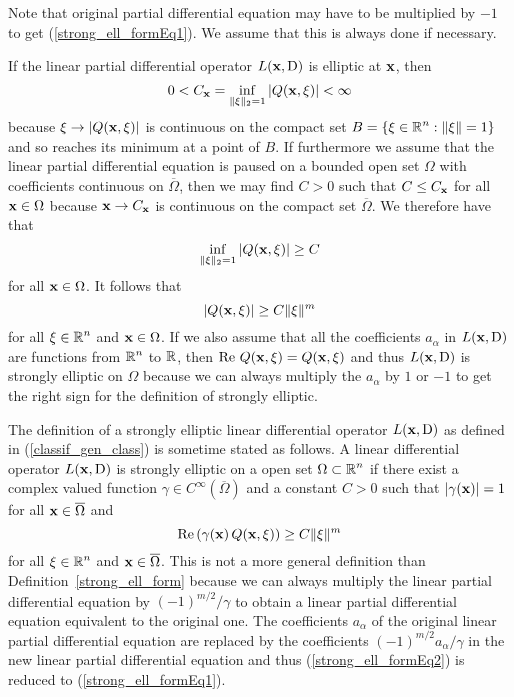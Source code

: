 Note that original partial differential equation may have to be
multiplied by $-1$ to get (\ref{strong_ell_formEq1}).  We assume that
this is always done if necessary.

\begin{rmk}
If the linear partial differential operator $L(\mathbf{x}, \operatorname{D})$
is elliptic at $\mathbf{x}$, then         \label{ell_implies_strong_ell}
\[
0 < C_{\mathbf{x}}
= \inf_{\|\mathbf{\xi}\|_2 = 1} \left| Q(\mathbf{x}, \mathbf{\xi}) \right| < \infty
\]
because $\mathbf{\xi} \to |Q(\mathbf{x},\mathbf{\xi})|$ is continuous on the
compact set $\displaystyle B= \{\mathbf{\xi}\in \mathbb{R}^n : \|\mathbf{\xi}\| = 1\}$
and so reaches its minimum at a point of $B$.  If furthermore we
assume that the linear partial differential equation is paused on a
bounded open set $\Omega$ with coefficients continuous on
$\overline{\Omega}$,  then we may find $C>0$ such that $C \leq
C_{\mathbf{x}}$ for all $\mathbf{x} \in \Omega$ because $\mathbf{x} \to
C_{\mathbf{x}}$ is continuous on the compact set $\overline{\Omega}$.  We
therefore have that
\[
  \inf_{\|\mathbf{\xi}\|_2 = 1} \left| Q(\mathbf{x}, \mathbf{\xi}) \right| \geq  C
\]
for all $\mathbf{x} \in \Omega$.  It follows that
\[
  \left| Q(\mathbf{x}, \mathbf{\xi}) \right| \geq  C \|\mathbf{\xi}\|^m
\]
for all $\displaystyle \mathbf{\xi} \in \mathbb{R}^n$ and $\mathbf{x} \in \Omega$.
If we also assume that all the coefficients $a_\alpha$ in
$L(\mathbf{x},\operatorname{D})$ are functions from $\displaystyle \mathbb{R}^n$ to $\mathbb{R}$, then
$\operatorname{Re}\, Q(\mathbf{x}, \mathbf{\xi}) = Q(\mathbf{x}, \mathbf{\xi})$ and thus
$L(\mathbf{x}, \operatorname{D})$ is strongly elliptic on $\Omega$
because we can always multiply the $a_{\alpha}$ by $1$ or $-1$ to get
the right sign for the definition of strongly elliptic.
\end{rmk}

\begin{rmk}
The definition of a strongly elliptic linear differential operator
$L(\mathbf{x}, \operatorname{D})$ as defined in (\ref{classif_gen_class}) is
sometime stated as follows.  A linear differential operator
$L(\mathbf{x}, \operatorname{D})$ is strongly elliptic on a open
set $\displaystyle \Omega \subset \mathbb{R}^n$ if there exist a complex
valued function
$\displaystyle \gamma \in C^\infty(\overline{\Omega})$ and a constant $C>0$ such
that $|\gamma(\mathbf{x})|=1$ for all $\mathbf{x} \in \overline{\Omega}$ and
\begin{equation} \label{strong_ell_formEq2}
\operatorname{Re}\left(\gamma(\mathbf{x})\, Q(\mathbf{x},\mathbf{\xi})\right) \geq C
\|\mathbf{\xi}\|^m
\end{equation}
for all $\displaystyle \mathbf{\xi} \in \mathbb{R}^n$ and
$\mathbf{x} \in \overline{\Omega}$.
This is not a more general definition than Definition~\ref{strong_ell_form}
because we can always multiply the linear partial differential
equation by $\displaystyle (-1)^{m/2}/\gamma$ to obtain a linear partial
differential equation equivalent to the original one.  The
coefficients $a_\alpha$ of the original linear partial differential
equation are replaced by the coefficients
$\displaystyle (-1)^{m/2} a_\alpha/\gamma$ in the new linear partial
differential equation and thus
(\ref{strong_ell_formEq2}) is reduced to (\ref{strong_ell_formEq1}).
\end{rmk}


